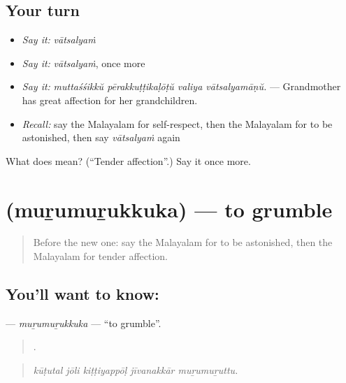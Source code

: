 \subsection*{Your turn}
\begin{itemize}
\raggedright
  \item \emph{Say it:} \emph{vātsalyaṁ}
  \item \emph{Say it:} \emph{vātsalyaṁ}, once more
  \item \emph{Say it:} \emph{muttaśśikkŭ pērakkuṭṭikaḷōṭŭ valiya vātsalyamāṇŭ.} — Grandmother has great affection for her grandchildren.
  \item \emph{Recall:} say the Malayalam for self-respect, then the Malayalam for to be astonished, then say \emph{vātsalyaṁ} again
\end{itemize}

\begin{tcolorbox}[breakable,colback=teal!4,colframe=teal!35!black,title={Before you move on}]
What does  mean? (\textquotedblleft{}Tender affection\textquotedblright{}.) Say it once more.
\end{tcolorbox}
\section[\texorpdfstring{\ml{മുറുമുറുക്കുക} (muṟumuṟukkuka)}{മുറുമുറുക്കുക (muṟumuṟukkuka)}]{ (muṟumuṟukkuka) — to grumble}

\label{lesson:ML-C519-murumurukkuka}



\begin{quote}
Before the new one: say the Malayalam for to be astonished, then the Malayalam for tender affection.
\end{quote}

\subsection*{You'll want to know: }
\textbf{} — \emph{muṟumuṟukkuka} — \textquotedblleft{}to grumble\textquotedblright{}.

\begin{quote}
    .
\end{quote}

\begin{quote}
\emph{kūṭutal jōli kiṭṭiyappōḷ jīvanakkār muṟumuṟuttu.}
\end{quote}

